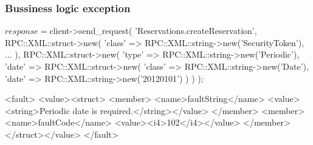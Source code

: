 \documentclass[a4paper]{report}
\begin{document}
\subsubsection{Bussiness logic exception}
\begin{PerlCmd}
$response = $client->send_request(
    'Reservations.createReservation',
    RPC::XML::struct->new(
        'class' => RPC::XML::string->new('SecurityToken'),
        ...
    ),
    RPC::XML::struct->new(
        'type' => RPC::XML::string->new('Periodic'),
        'date' => RPC::XML::struct->new(
            'class' => RPC::XML::string->new('Date'),
            'date' => RPC::XML::string->new('20120101')
        )
    )
);
\end{PerlCmd}
\begin{PerlResponse}
<fault>
  <value><struct>
    <member>
      <name>faultString</name>
      <value><string>Periodic date is required.</string></value>
    </member>
    <member>
      <name>faultCode</name>
      <value><i4>102</i4></value>
    </member>
  </struct></value>
</fault>
\end{PerlResponse}





\end{document}
